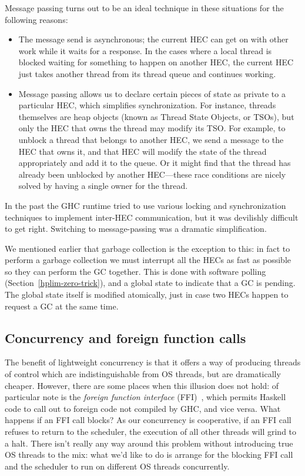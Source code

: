 Message passing turns out to be an ideal technique in these situations
for the following reasons:

\begin{itemize}
\item The message send is asynchronous; the current HEC can get on
  with other work while it waits for a response.  In the cases where a
  local thread is blocked waiting for something to happen on another
  HEC, the current HEC just takes another thread from its thread queue
  and continues working.

\item Message passing allows us to declare certain pieces of state as
  private to a particular HEC, which simplifies synchronization.  For
  instance, threads themselves are heap objects (known as Thread State
  Objects, or TSOs), but only the HEC that owns the thread may modify
  its TSO.  For example, to unblock a thread that belongs to another
  HEC, we send a message to the HEC that owns it, and that HEC will
  modify the state of the thread appropriately and add it to the
  queue.  Or it might find that the thread has already been unblocked
  by another HEC---these race conditions are nicely solved by having a
  single owner for the thread.
\end{itemize}

In the past the GHC runtime tried to use various locking and
synchronization techniques to implement inter-HEC communication, but
it was devilishly difficult to get right.  Switching to
message-passing was a dramatic simplification.

We mentioned earlier that garbage collection is the exception to this:
in fact to perform a garbage collection we must interrupt all the HECs
as fast as possible so they can perform the GC together.  This is done
with software polling (Section~\ref{hplim-zero-trick}), and a global
state to indicate that a GC is pending.  The global state itself is
modified atomically, just in case two HECs happen to request a GC at
the same time.

\subsection{Concurrency and foreign function calls}

The benefit of lightweight concurrency is that it offers a way of
producing threads of control which are indistinguishable from OS
threads, but are dramatically cheaper.  However, there are some places
when this illusion does not hold: of particular note is the
\emph{foreign function interface} (FFI)~\cite{Marlow04extendingthe},
which permits Haskell code to call out to foreign code not compiled by
GHC, and vice versa.  What happens if an FFI call blocks?  As our
concurrency is cooperative, if an FFI call refuses to return to the
scheduler, the execution of all other threads will grind to a halt.
There isn't really any way around this problem without introducing true
OS threads to the mix: what we'd like to do is arrange for the blocking
FFI call and the scheduler to run on different OS threads concurrently.

